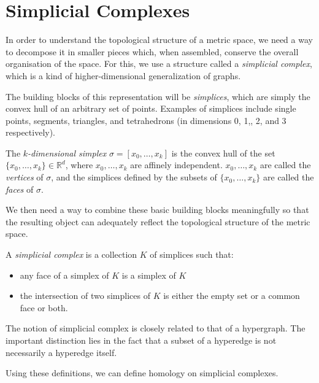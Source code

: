 \documentclass[a4paper,11pt,openany,extrafontsizes]{memoir}
\begin{document}
\section{Simplicial Complexes}%
\label{sec:simplicial-complexes}

In order to understand the topological structure of a metric space, we
need a way to decompose it in smaller pieces which, when assembled,
conserve the overall organisation of the space. For this, we use a
structure called a \emph{simplicial complex}, which is a kind of
higher-dimensional generalization of graphs.

The building blocks of this representation will be \emph{simplices},
which are simply the convex hull of an arbitrary set of
points. Examples of simplices include single points, segments,
triangles, and tetrahedrons (in dimensions 0, 1,, 2, and 3
respectively).

\begin{defn}[Simplex]
  The \emph{$k$-dimensional simplex} $\sigma = [x_0,\ldots,x_k]$ is
  the convex hull of the set $\{x_0,\ldots,x_k\} \in \mathbb{R}^d$,
  where $x_0,\ldots,x_k$ are affinely independent. $x_0,\ldots,x_k$
  are called the \emph{vertices} of $\sigma$, and the simplices
  defined by the subsets of $\{x_0,\ldots,x_k\}$ are called the
  \emph{faces} of $\sigma$.
\end{defn}

We then need a way to combine these basic building blocks meaningfully
so that the resulting object can adequately reflect the topological
structure of the metric space.

\begin{defn}
  A \emph{simplicial complex} is a collection $K$ of simplices such
  that:
  \begin{itemize}
  \item any face of a simplex of $K$ is a simplex of $K$
  \item the intersection of two simplices of $K$ is either the empty
    set or a common face or both.
  \end{itemize}
\end{defn}


The notion of simplicial complex is closely related to that of a
hypergraph. The important distinction lies in the fact that a subset
of a hyperedge is not necessarily a hyperedge itself.

Using these definitions, we can define homology on simplicial
complexes. %
\end{document}
